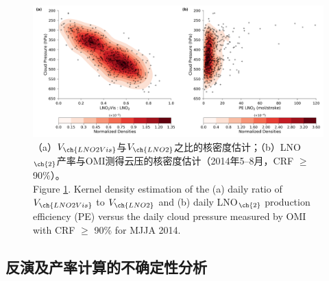 \begin{figure}[H]
\centering
\includegraphics[width=\textwidth]{./figures/us_cp_ratio_lno2.png}
\caption{（a）$V_{\ch{LNO2Vis}}$与$V_{\ch{LNO2}}$之比的核密度估计；（b）LNO$_{\ch{2}}$产率与OMI测得云压的核密度估计（2014年5--8月，CRF $\geq$ 90\%）。\\
Figure \ref{fig:us_cp_ratio_lno2}. Kernel density estimation of the (a) daily ratio of $V_{\ch{LNO2Vis}}$ to $V_{\ch{LNO2}}$ and (b) daily LNO$_{\ch{2}}$ production efficiency (PE) versus the daily cloud pressure measured by OMI with CRF $\geq$ 90\% for MJJA 2014.}
\label{fig:us_cp_ratio_lno2}
\end{figure}




\subsection{反演及产率计算的不确定性分析}


